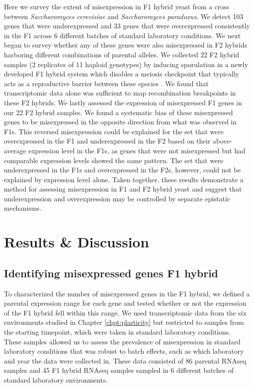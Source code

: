 
Here we survey the extent of misexpression in F1 hybrid yeast from a cross between \textit{Saccharomyces cerevisiae} and \textit{Saccharomyces paradoxus}. We detect 103 genes that were underexpressed and 33 genes that were overexpressed consistently in the F1 across 6 different batches of standard laboratory conditions. We next began to survey whether any of these genes were also misexpressed in F2 hybrids harboring different combinations of parental alleles. We collected 22 F2 hybrid samples (2 replicates of 11 haploid genotypes) by inducing sporulation in a newly developed F1 hybrid system which disables a meiosis checkpoint that typically acts as a reproductive barrier between these species \cite{Bozdag2021}. We found that transcriptomic data alone was sufficient to map recombination breakpoints in these F2 hybrids. We lastly assessed the expression of misexpressed F1 genes in our 22 F2 hybrid samples. We found a systematic bias of these misexpressed genes to be misexpressed in the opposite direction from what was observed in F1s. This reversed misexpression could be explained for the set that were overexpressed in the F1 and underexpressed in the F2 based on their above-average expression level in the F1s, as genes that were not misexpressed but had comparable expression levels showed the same pattern. The set that were underexpressed in the F1s and overexpressed in the F2s, however, could not be explained by expression level alone. Taken together, these results demonstrate a method for assessing misexpression in F1 and F2 hybrid yeast and suggest that underexpression and overexpression may be controlled by separate epistatic mechanisms.

\section{Results \& Discussion}

\subsection{Identifying misexpressed genes F1 hybrid}

To characterized the number of misexpressed genes in the F1 hybrid, we defined a parental expression range for each gene and tested whether or not the expression of the F1 hybrid fell within this range. We used transcriptomic data from the six environments studied in Chapter \ref{chpt:plasticity} but restricted to samples from the starting timepoint, which were taken in standard laboratory conditions. These samples allowed us to assess the prevalence of misexpression in standard laboratory conditions that was robust to batch effects, such as which laboratory and year the data were collected in. These data consisted of 86 parental RNAseq samples and 45 F1 hybrid RNAseq samples sampled in 6 different batches of standard laboratory environments.

